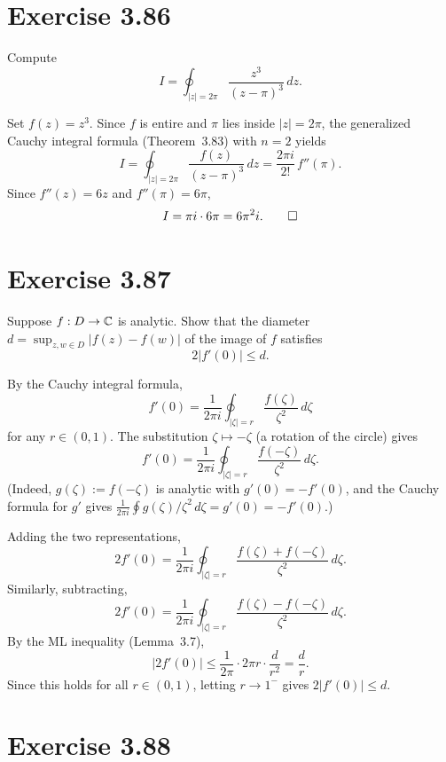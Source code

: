 \documentclass{article}
\begin{document}
\section{Exercise 3.86}

Compute
\[
  I = \oint_{|z|=2\pi} \frac{z^3}{(z-\pi)^3}\,dz.
\]

\begin{solution}
  Set $f(z) = z^3$.  Since $f$ is entire and $\pi$ lies inside
  $|z|=2\pi$, the generalized Cauchy integral formula
  (Theorem~3.83) with $n=2$ yields
  \[
    I = \oint_{|z|=2\pi}\frac{f(z)}{(z-\pi)^3}\,dz
    = \frac{2\pi i}{2!}\,f''(\pi).
  \]
  Since $f''(z) = 6z$ and $f''(\pi) = 6\pi$,
  \[
    I = \pi i \cdot 6\pi = 6\pi^2 i.\qedhere
  \]
\end{solution}

\section{Exercise 3.87}

Suppose $f : D \to \mathbb{C}$ is analytic. Show that the diameter
$d = \sup_{z,w \in D} |f(z) - f(w)|$ of the image of $f$ satisfies
\[
  2|f'(0)| \le d.
\]

\begin{solution}
  By the Cauchy integral formula,
  \[
    f'(0) = \frac{1}{2\pi i}\oint_{|\zeta|=r}
    \frac{f(\zeta)}{\zeta^2}\,d\zeta
  \]
  for any $r \in (0,1)$.
  The substitution $\zeta \mapsto -\zeta$ (a rotation of the
  circle) gives
  \[
    f'(0) = \frac{1}{2\pi i}\oint_{|\zeta|=r}
    \frac{f(-\zeta)}{\zeta^2}\,d\zeta.
  \]
  (Indeed, $g(\zeta) := f(-\zeta)$ is analytic with
  $g'(0) = -f'(0)$, and the Cauchy formula for $g'$ gives
  $\frac{1}{2\pi i}\oint g(\zeta)/\zeta^2\,d\zeta = g'(0) = -f'(0)$.)

  Adding the two representations,
  \[
    2f'(0) = \frac{1}{2\pi i}\oint_{|\zeta|=r}
    \frac{f(\zeta)+f(-\zeta)}{\zeta^2}\,d\zeta.
  \]
  Similarly, subtracting,
  \[
    2f'(0) = \frac{1}{2\pi i}\oint_{|\zeta|=r}
    \frac{f(\zeta)-f(-\zeta)}{\zeta^2}\,d\zeta.
  \]
  By the ML inequality (Lemma~3.7),
  \[
    |2f'(0)|
    \le \frac{1}{2\pi}\cdot 2\pi r\cdot\frac{d}{r^2}
    = \frac{d}{r}.
  \]
  Since this holds for all $r \in (0,1)$, letting
  $r \to 1^-$ gives $2|f'(0)| \le d$.\qedhere
\end{solution}

\section{Exercise 3.88}
\end{document}
